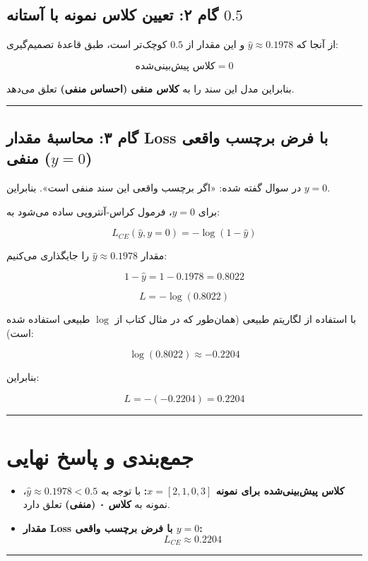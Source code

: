 \documentclass[11pt,a4paper]{article}
\newcommand{\en}[1]{\textenglish{#1}}
\newcommand{\separator}{\vspace{1em}\noindent\rule{\linewidth}{0.4pt}\vspace{1em}}
\newcommand{\thickseparator}{\vspace{1em}\noindent\rule{\linewidth}{1pt}\vspace{1em}}
\begin{document}
\subsection{گام ۲: تعیین کلاس نمونه با آستانه \(0.5\)}
از آنجا که \(\hat{y} \approx 0.1978\) و این مقدار از \(0.5\) کوچک‌تر است، طبق قاعدهٔ تصمیم‌گیری:

\[
\text{کلاس پیش‌بینی‌شده} = 0
\]

بنابراین مدل این سند را به \textbf{کلاس منفی (احساس منفی)} تعلق می‌دهد.

\separator
\subsection{گام ۳: محاسبهٔ مقدار Loss با فرض برچسب واقعی منفی (\(y=0\))}
در سوال گفته شده: «اگر برچسب واقعی این سند منفی است». بنابراین \(y = 0\).

برای \(y=0\)، فرمول کراس-آنتروپی ساده می‌شود به:

\[
L_{CE}(\hat{y}, y=0) = -\log(1-\hat{y})
\]

مقدار \(\hat{y} \approx 0.1978\) را جایگذاری می‌کنیم:

\[
1 - \hat{y} = 1 - 0.1978 = 0.8022
\]

\[
L = -\log(0.8022)
\]

با استفاده از لگاریتم طبیعی (همان‌طور که در مثال کتاب از \(\log\) طبیعی استفاده شده است):

\[
\log(0.8022) \approx -0.2204
\]

بنابراین:

\[
L = -(-0.2204) = 0.2204
\]

\separator
\section{جمع‌بندی و پاسخ نهایی}

\begin{itemize}
    \item \textbf{کلاس پیش‌بینی‌شده برای نمونه \(x = [2,1,0,3]\):}  
    با توجه به \(\hat{y} \approx 0.1978 < 0.5\)، نمونه به \textbf{کلاس ۰ (منفی)} تعلق دارد.
    
    \item \textbf{مقدار Loss با فرض برچسب واقعی \(y = 0\):}  
    \[
    L_{CE} \approx 0.2204
    \]
\end{itemize}


\thickseparator
\end{document}
